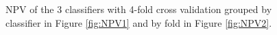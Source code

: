 \documentclass[a4paper,11pt]{article}
\begin{document}
\begin{figure}[H]%
	\centering
	\caption{\footnotesize NPV of the 3 classifiers with 4-fold cross validation grouped by classifier in Figure \ref{fig:NPV1} and by fold in Figure \ref{fig:NPV2}. }
	\label{fig:RealNPV}
\end{figure}
\end{document}
